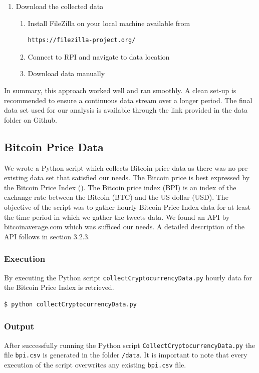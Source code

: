 \documentclass[a4paper,12pt]{article}
\begin{document}
\begin{spacing}{1.2}
\begin{enumerate}
\item Download the collected data
\begin{enumerate}
\item Install FileZilla on your local machine available from
\begin{lstlisting}[language=bash] 
https://filezilla-project.org/
\end{lstlisting}
\item Connect to RPI and navigate to data location \newline
\item Download data manually \newline \newline \end{enumerate}
\end{enumerate}

In summary, this approach worked well and ran smoothly. A clean set-up is recommended to ensure a continuous data stream over a longer period. The final data set used for our analysis is available through the link provided in the data folder on Github. 


\subsection{Bitcoin Price Data}
We wrote a Python script which collects Bitcoin price data as there was no pre-existing data set that satisfied our needs. The Bitcoin price is best expressed by the Bitcoin Price Index (\cite{kristoufek2015main}). The Bitcoin price index (BPI) is an index of the exchange rate between the Bitcoin (BTC) and the US dollar (USD). The objective of the script was to gather hourly Bitcoin Price Index data for at least the time period in which we gather the tweets data. We found an API by bitcoinaverage.com which was sufficed our needs. A detailed description of the API follows in section 3.2.3.

\subsubsection{Execution}
By executing the Python script \verb|collectCryptocurrencyData.py| hourly data for the Bitcoin Price Index is retrieved.
\begin{lstlisting}[language=bash]
    $ python collectCryptocurrencyData.py
\end{lstlisting}

\subsubsection{Output}
After successfully running the Python script \verb|CollectCryptocurrencyData.py| the file \verb|bpi.csv| is generated in the folder \verb|/data|. It is important to note that every execution of the script overwrites any existing \verb|bpi.csv| file.


\end{spacing}
\end{document}
